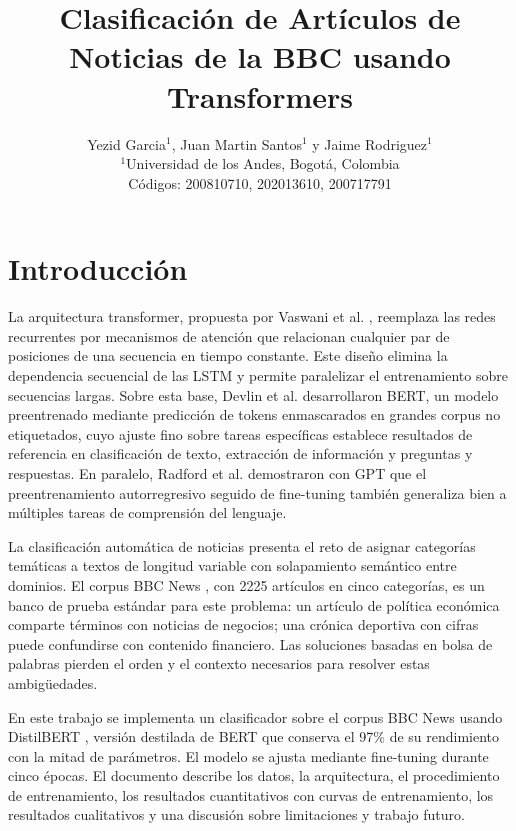 \documentclass[letterpaper, 10 pt, conference]{latex_template/ieeeconf}
\title{\LARGE \bf
Clasificación de Artículos de Noticias de la BBC usando Transformers
}
\author{Yezid Garcia$^{1}$, Juan Martin Santos$^{1}$ y Jaime Rodriguez$^{1}$ \\
{\small $^{1}$Universidad de los Andes, Bogotá, Colombia} \\
{\small Códigos: 200810710, 202013610, 200717791}
}
\begin{document}
\maketitle
\thispagestyle{empty}
\pagestyle{empty}

\section{Introducción}

La arquitectura transformer, propuesta por Vaswani et al. \cite{c1}, reemplaza las redes recurrentes por mecanismos de atención que relacionan cualquier par de posiciones de una secuencia en tiempo constante. Este diseño elimina la dependencia secuencial de las LSTM y permite paralelizar el entrenamiento sobre secuencias largas. Sobre esta base, Devlin et al. \cite{c2} desarrollaron BERT, un modelo preentrenado mediante predicción de tokens enmascarados en grandes corpus no etiquetados, cuyo ajuste fino sobre tareas específicas establece resultados de referencia en clasificación de texto, extracción de información y preguntas y respuestas. En paralelo, Radford et al. \cite{c3} demostraron con GPT que el preentrenamiento autorregresivo seguido de fine-tuning también generaliza bien a múltiples tareas de comprensión del lenguaje.

La clasificación automática de noticias presenta el reto de asignar categorías temáticas a textos de longitud variable con solapamiento semántico entre dominios. El corpus BBC News \cite{c4}, con 2225 artículos en cinco categorías, es un banco de prueba estándar para este problema: un artículo de política económica comparte términos con noticias de negocios; una crónica deportiva con cifras puede confundirse con contenido financiero. Las soluciones basadas en bolsa de palabras pierden el orden y el contexto necesarios para resolver estas ambigüedades.

En este trabajo se implementa un clasificador sobre el corpus BBC News usando DistilBERT \cite{c5}, versión destilada de BERT que conserva el 97\% de su rendimiento con la mitad de parámetros. El modelo se ajusta mediante fine-tuning durante cinco épocas. El documento describe los datos, la arquitectura, el procedimiento de entrenamiento, los resultados cuantitativos con curvas de entrenamiento, los resultados cualitativos y una discusión sobre limitaciones y trabajo futuro.

\end{document}
